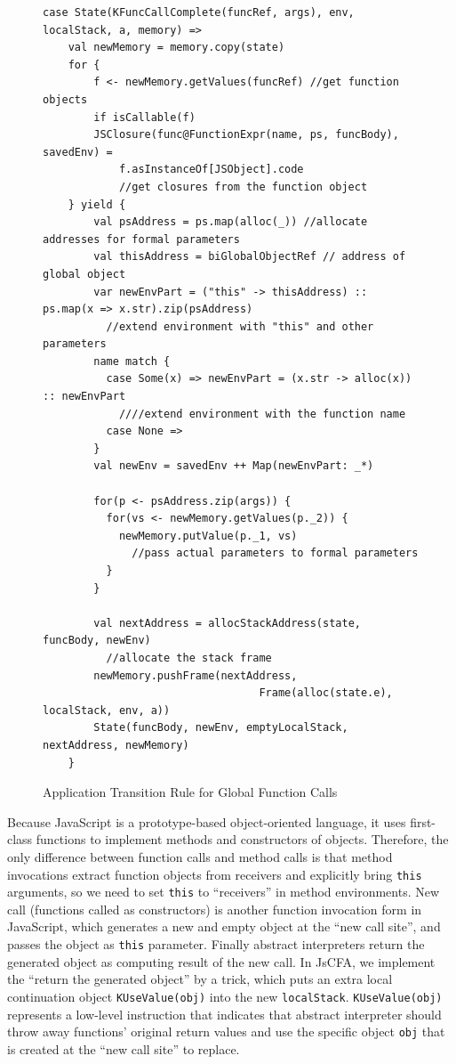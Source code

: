 \documentclass{article}
\begin{document}
\begin{figure}
  \lstset{language=Scala}
  \begin{lstlisting}
case State(KFuncCallComplete(funcRef, args), env, localStack, a, memory) =>
    val newMemory = memory.copy(state)
    for {
        f <- newMemory.getValues(funcRef) //get function objects
        if isCallable(f)
        JSClosure(func@FunctionExpr(name, ps, funcBody), savedEnv) =
            f.asInstanceOf[JSObject].code
            //get closures from the function object
    } yield {
        val psAddress = ps.map(alloc(_)) //allocate addresses for formal parameters
        val thisAddress = biGlobalObjectRef // address of global object
        var newEnvPart = ("this" -> thisAddress) :: ps.map(x => x.str).zip(psAddress)
          //extend environment with "this" and other parameters
        name match {
          case Some(x) => newEnvPart = (x.str -> alloc(x)) :: newEnvPart
            ////extend environment with the function name
          case None =>
        }
        val newEnv = savedEnv ++ Map(newEnvPart: _*)

        for(p <- psAddress.zip(args)) {
          for(vs <- newMemory.getValues(p._2)) {
            newMemory.putValue(p._1, vs)
              //pass actual parameters to formal parameters
          }
        }

        val nextAddress = allocStackAddress(state, funcBody, newEnv)
          //allocate the stack frame
        newMemory.pushFrame(nextAddress,
                                  Frame(alloc(state.e), localStack, env, a))
        State(funcBody, newEnv, emptyLocalStack, nextAddress, newMemory)
    }

  \end{lstlisting}
  \caption{Application Transition Rule for Global Function Calls}
\label{fig:app-call}
\end{figure}

Because JavaScript is a prototype-based object-oriented language, it uses first-class functions to implement methods and constructors of objects.
Therefore, the only difference between function calls and method calls is that method invocations extract function objects from receivers and explicitly bring \verb|this| arguments, so we need to set \verb|this| to ``receivers'' in method environments.
New call (functions called as constructors) is another function invocation form in JavaScript, which generates a new and empty object at the ``new call site'', and passes the object as \verb|this| parameter. Finally abstract interpreters return the generated object as computing result of the new call.
In JsCFA, we implement the ``return the generated object'' by a trick, which puts an extra local continuation object \verb|KUseValue(obj)| into the new \verb|localStack|.
\verb|KUseValue(obj)| represents a low-level instruction that indicates that abstract interpreter should throw away functions' original return values and use the specific object \verb|obj| that is created at the ``new call site'' to replace.
\end{document}
